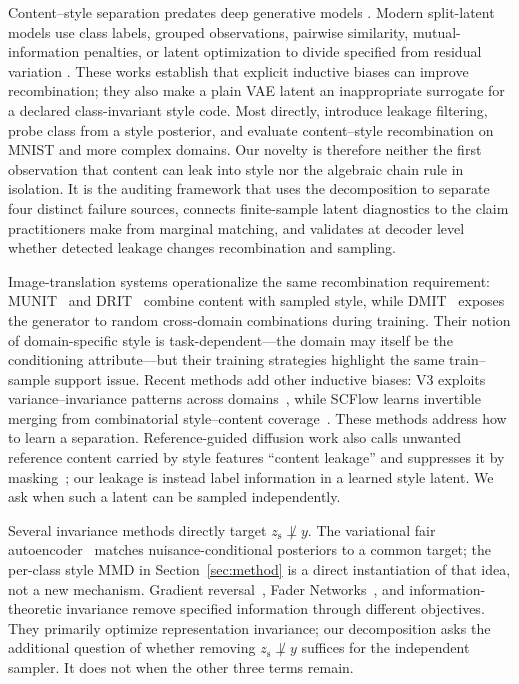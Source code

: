 \documentclass[letterpaper]{article} %
\newcommand{\zs}{z_{\mathrm{s}}}
\begin{document}
Content--style separation predates deep generative models
\citep{tenenbaum2000separating}. Modern split-latent models use class labels,
grouped observations, pairwise similarity, mutual-information penalties, or
latent optimization to divide specified from residual variation
\citep{mathieu2016disentangling,bouchacourt2018multilevel,jha2018cycle,klys2018subspaces,zheng2019label,ilse2020diva,gabbay2020lord}.
These works establish that explicit inductive biases can improve
recombination; they also make a plain VAE latent an inappropriate surrogate
for a declared class-invariant style code. Most directly,
\citet{ridgeway2018leakage} introduce leakage filtering, probe class from a
style posterior, and evaluate content--style recombination on MNIST and more
complex domains. Our novelty is therefore neither the first observation that
content can leak into style nor the algebraic chain rule in isolation. It is
the auditing framework that uses the decomposition to separate four distinct
failure sources, connects finite-sample latent diagnostics to the claim
practitioners make from marginal matching, and validates at decoder level
whether detected leakage changes recombination and sampling.

Image-translation systems operationalize the same recombination requirement:
MUNIT~\citep{huang2018munit} and DRIT~\citep{lee2018drit} combine content with
sampled style, while DMIT~\citep{yu2019dmit} exposes the generator to random
cross-domain combinations during training. Their notion of domain-specific
style is task-dependent---the domain may itself be the conditioning
attribute---but their training strategies highlight the same train--sample
support issue. Recent methods add other inductive biases: V3 exploits
variance--invariance patterns across domains~\citep{wu2025variance}, while
SCFlow learns invertible merging from combinatorial style--content
coverage~\citep{ma2025scflow}. These methods address how to learn a
separation. Reference-guided diffusion work also calls unwanted reference
content carried by style features ``content leakage'' and suppresses it by
masking~\citep{zhu2025less}; our leakage is instead label information in a
learned style latent. We ask when such a latent can be sampled independently.

Several invariance methods directly target $\zs\not\perp y$. The variational
fair autoencoder~\citep{louizos2015variational} matches nuisance-conditional
posteriors to a common target; the per-class style MMD in
Section~\ref{sec:method} is a direct instantiation of that idea, not a new
mechanism. Gradient reversal~\citep{ganin2015unsupervised}, Fader
Networks~\citep{lample2017fader}, and information-theoretic invariance
\citep{moyer2018invariant} remove specified information through different
objectives. They primarily optimize representation invariance; our
decomposition asks the additional question of whether removing
$\zs\not\perp y$ suffices for the independent sampler. It does not when the
other three terms remain.
\end{document}

